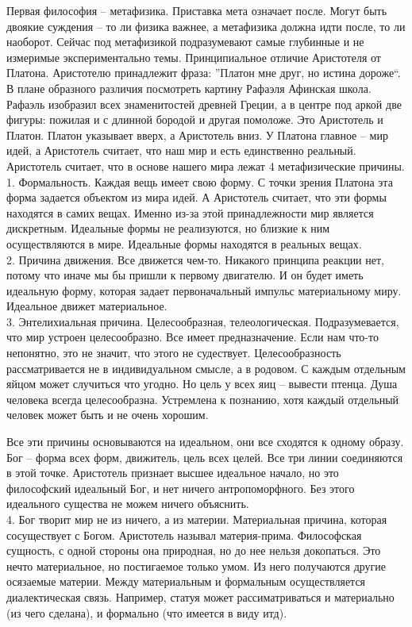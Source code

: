 \documentclass[a4paper, 12pt]{article}
\def\t{\hspace*{1cm}}
\begin{document}
Первая философия -- метафизика. Приставка мета означает после. Могут быть двоякие суждения -- то ли физика важнее, а метафизика должна идти после, то ли наоборот. Сейчас под метафизикой подразумевают самые глубинные и не измеримые экспериментально темы. Принципиальное отличие Аристотеля от Платона. Аристотелю принадлежит фраза: ''Платон мне друг, но истина дороже``. В плане образного различия посмотреть картину Рафаэля Афинская школа. Рафаэль изобразил всех знаменитостей древней Греции, а в центре под аркой две фигуры: пожилая и с длинной бородой и другая помоложе. Это Аристотель и Платон. Платон указывает вверх, а Аристотель вниз. У Платона главное -- мир идей, а Аристотель считает, что наш мир и есть единственно реальный. Аристотель считает, что в основе нашего мира лежат 4 метафизические причины. 
\\\t 1. Формальность. Каждая вещь имеет свою форму. С точки зрения Платона эта форма задается объектом из мира идей. А Аристотель считает, что эти формы находятся в самих вещах. Именно из-за этой принадлежности мир является дискретным. Идеальные формы не реализуются, но близкие к ним осуществляются в мире. Идеальные формы находятся в реальных вещах. 
\\\t 2. Причина движения. Все движется чем-то. Никакого принципа реакции нет, потому что иначе мы бы пришли к первому двигателю. И он будет иметь идеальную форму, которая задает первоначальный импульс материальному миру. Идеальное движет материальное. 
\\\t 3. Энтелихиальная причина. Целесообразная, телеологическая. Подразумевается, что мир устроен целесообразно. Все имеет предназначение. Если нам что-то непонятно, это не значит, что этого не судествует. Целесообразность рассматривается не в индивидуальном смысле, а в родовом. С каждым отдельным яйцом может случиться что угодно. Но цель у всех яиц -- вывести птенца. Душа человека всегда целесообразна. Устремлена к познанию, хотя каждый отдельный человек может быть и не очень хорошим. 

Все эти причины основываются на идеальном, они все сходятся к одному образу. Бог -- форма всех форм, движитель, цель всех целей. Все три линии соединяются в этой точке. Аристотель признает высшее идеальное начало, но это философский идеальный Бог, и нет ничего антропоморфного. Без этого идеального существа не можем ничего объяснить. 
\\\t 4. Бог творит мир не из ничего, а из материи. Материальная причина, которая сосуществует с Богом. Аристотель называл материя-прима. Философская сущность, с одной стороны она природная, но до нее нельзя докопаться. Это нечто материальное, но постигаемое только умом. Из него получаются другие осязаемые материи. Между материальным и формальным осуществляется диалектическая связь. Например, статуя может рассиматриваться и материально (из чего сделана), и формально (что имеется в виду итд). 
\end{document}
